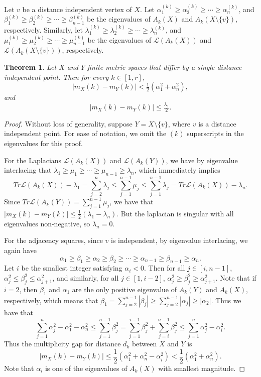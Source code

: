 \documentclass[12pt]{article}
\newtheorem{thm}{Theorem}[section] %
\theoremstyle{definition}
\begin{document}
	Let $v$ be a distance independent vertex of $X$.  Let $\alpha_1^{(k)} \geq \alpha_2^{(k)} \geq \cdots \geq \alpha_n^{(k)}$, and $\beta_1^{(k)} \geq \beta_2^{(k)} \geq \cdots \geq \beta_{n-1}^{(k)}$ be the eigenvalues of $A_k(X)$ and $A_k(X \setminus \{v\})$, respectively.  Similarly, let $\lambda_1^{(k)} \geq \lambda_2^{(k)} \geq \cdots \geq \lambda_n^{(k)}$, and $\mu_1^{(k)} \geq \mu_2^{(k)} \geq \cdots \geq \mu_{n-1}^{(k)}$ be the eigenvalues of $\mathcal{L}(A_k(X))$ and $\mathcal{L}(A_k(X \setminus \{v\}))$, respectively.
	\begin{thm}
		  Let $X$ and $Y$ finite metric spaces that differ by a single distance independent point.  Then for every $k \in [1,r]$, 
		$$|m_X(k) - m_{Y}(k)| < \tfrac{1}{2}(\alpha_1^2 + \alpha_n^2),$$
		and
		$$|m_X(k) - m_{Y}(k)| \leq \tfrac{\lambda_1}{2}.$$
	\end{thm}
	\begin{proof}
		Without loss of generality, suppose $Y = X \setminus \{v\}$, where $v$ is a distance independent point.  For ease of notation, we omit the $(k)$ superscripts in the eigenvalues for this proof.  
		
		For the Laplacians $\mathcal{L}(A_k(X))$ and $\mathcal{L}(A_k(Y))$, we have by eigenvalue interlacing that $\lambda_1 \geq \mu_1 \geq \cdots \geq \mu_{n-1} \geq \lambda_n$, which immediately implies
		$$Tr\mathcal{L}(A_k(X)) - \lambda_1 = \sum_{j=2}^n \lambda_j \leq \sum_{j=1}^{n-1}\mu_j \leq \sum_{j = 1}^{n-1}\lambda_j = Tr\mathcal{L}(A_k(X)) - \lambda_n.$$
		Since $Tr\mathcal{L}(A_k(Y)) = \sum_{j=1}^{n-1}\mu_j$, we have that $|m_X(k) - m_Y(k)| \leq \tfrac{1}{2}(\lambda_1 - \lambda_n)$.  But the laplacian is singular with all eigenvalues non-negative, so $\lambda_n = 0$.
		
		For the adjacency squares, since $v$ is independent, by eigenvalue interlacing, we again have
		$$\alpha_1 \geq \beta_1 \geq \alpha_2 \geq \beta_2 \geq \cdots \geq \alpha_{n-1} \geq \beta_{n-1} \geq \alpha_n.$$
		Let $i$ be the smallest integer satisfying $\alpha_i< 0$.  Then for all $j \in [i,n-1]$, $\alpha_j^2 \leq \beta_j^2 \leq \alpha_{j+1}^2$, and similarly, for all $j \in [1,i-2]$, $\alpha_j^2 \geq \beta_j^2 \geq \alpha_{j+1}^2$.  Note that if $i = 2$, then $\beta_1$ and $\alpha_1$ are the only positive eigenvalue of $A_k(Y)$ and $A_k(X)$, respectively, which means that $\beta_1 = \sum_{j=2}^{n-1}|\beta_j| \geq \sum_{j=2}^{n-1}|\alpha_j| \geq |\alpha_2|$.  Thus we have that
		$$\sum_{j=1}^n\alpha_j^2 - \alpha_1^2 - \alpha_n^2 \leq \sum_{j = 1}^{n-1}\beta_j^2 = \sum_{j=1}^{i-1} \beta_j^2 + \sum_{j=i}^{n-1}\beta_j^2 \leq \sum_{j=1}^{n}\alpha_j^2 - \alpha_i^2.$$
		Thus the multiplicity gap for distance $d_k$ between $X$ and $Y$ is 
		$$|m_X(k) - m_Y(k)| \leq \frac{1}{2}(\alpha_1^2 + \alpha_n^2 - \alpha_i^2) < \frac{1}{2}(\alpha_1^2 + \alpha_n^2).$$
		Note that $\alpha_i$ is one of the eigenvalues of $A_k(X)$ with smallest magnitude.
	\end{proof}
\end{document}
